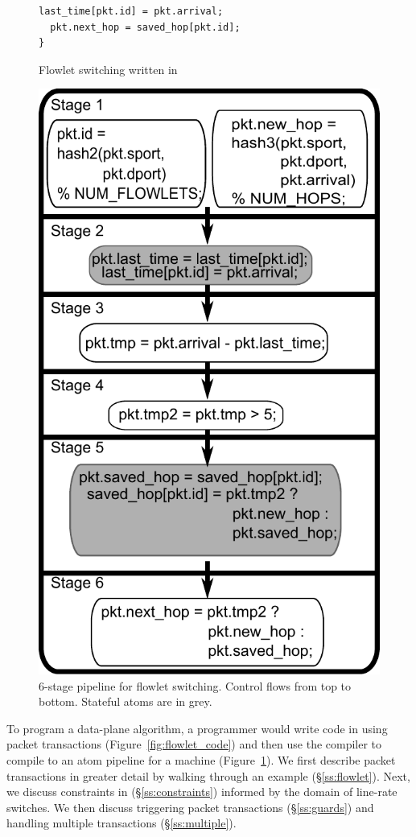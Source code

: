 \begin{figure}[!t]
\begin{minipage}{0.5\textwidth}
\begin{small}
\begin{lstlisting}[style=customc]
  last_time[pkt.id] = pkt.arrival;
  pkt.next_hop = saved_hop[pkt.id];
}
\end{lstlisting}
\end{small}
\caption{Flowlet switching written in \pktlanguage}
\label{fig:flowlet_code}
\end{minipage}
%
\vrule\quad
%
\begin{minipage}{0.4\textwidth}
\includegraphics[width=0.8\columnwidth]{pipe.pdf}
\caption{6-stage \absmachine pipeline for flowlet
switching.  Control flows from top to bottom. Stateful atoms are in grey.}
\label{fig:flowlet_pipeline}
\end{minipage}
\end{figure}

To program a data-plane algorithm, a programmer would write code in
\pktlanguage using packet transactions (Figure~\ref{fig:flowlet_code})
and then use the \pktlanguage compiler to compile to an atom pipeline
for a \absmachine machine (Figure~\ref{fig:flowlet_pipeline}). We
first describe packet transactions in greater detail by walking
through an example (\S\ref{ss:flowlet}). Next, we discuss constraints
in \pktlanguage (\S\ref{ss:constraints}) informed by the domain of
line-rate switches. We then discuss triggering packet transactions
(\S\ref{ss:guards}) and handling multiple transactions
(\S\ref{ss:multiple}).

